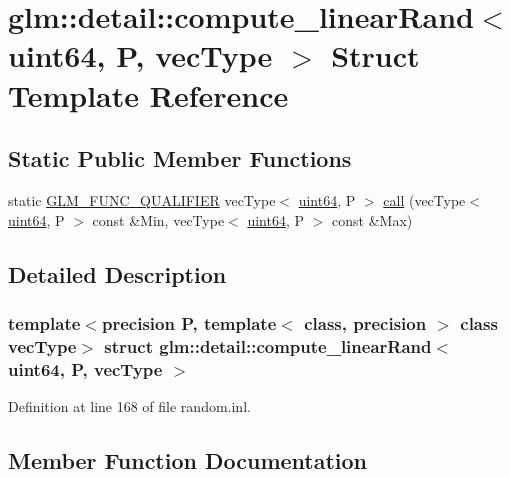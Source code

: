 \hypertarget{structglm_1_1detail_1_1compute__linear_rand_3_01uint64_00_01_p_00_01vec_type_01_4}{}\section{glm\+::detail\+::compute\+\_\+linear\+Rand$<$ uint64, P, vec\+Type $>$ Struct Template Reference}
\label{structglm_1_1detail_1_1compute__linear_rand_3_01uint64_00_01_p_00_01vec_type_01_4}
\subsection*{Static Public Member Functions}
\begin{DoxyCompactItemize}
\item 
static \mbox{\hyperlink{setup_8hpp_a33fdea6f91c5f834105f7415e2a64407}{G\+L\+M\+\_\+\+F\+U\+N\+C\+\_\+\+Q\+U\+A\+L\+I\+F\+I\+ER}} vec\+Type$<$ \mbox{\hyperlink{namespaceglm_1_1detail_adec4b19bf4982125e122db2fe03c5810}{uint64}}, P $>$ \mbox{\hyperlink{structglm_1_1detail_1_1compute__linear_rand_3_01uint64_00_01_p_00_01vec_type_01_4_afc443abbff12752de8c78096639a6ff4}{call}} (vec\+Type$<$ \mbox{\hyperlink{namespaceglm_1_1detail_adec4b19bf4982125e122db2fe03c5810}{uint64}}, P $>$ const \&Min, vec\+Type$<$ \mbox{\hyperlink{namespaceglm_1_1detail_adec4b19bf4982125e122db2fe03c5810}{uint64}}, P $>$ const \&Max)
\end{DoxyCompactItemize}


\subsection{Detailed Description}
\subsubsection*{template$<$precision P, template$<$ class, precision $>$ class vec\+Type$>$\newline
struct glm\+::detail\+::compute\+\_\+linear\+Rand$<$ uint64, P, vec\+Type $>$}



Definition at line 168 of file random.\+inl.



\subsection{Member Function Documentation}
\mbox{\label{structglm_1_1detail_1_1compute__linear_rand_3_01uint64_00_01_p_00_01vec_type_01_4_afc443abbff12752de8c78096639a6ff4}} 
